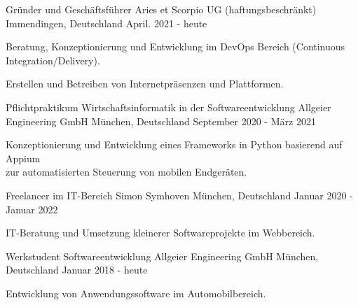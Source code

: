 

\begin{cventries}

  \cventry
    {Gründer und Geschäftsführer} %
    {Aries et Scorpio UG (haftungsbeschränkt)} %
    {Immendingen, Deutschland} %
    {April. 2021 - heute} %
    {
      \begin{cvitems} %
        \item {Beratung, Konzeptionierung und Entwicklung im DevOps Bereich (Continuous Integration/Delivery).}
        \item {Erstellen und Betreiben von Internetpräsenzen und Plattformen. }
      \end{cvitems}
    }
    
  \cventry
    {Pflichtpraktikum Wirtschaftsinformatik in der Softwareentwicklung} %
    {Allgeier Engineering GmbH} %
    {München, Deutschland} %
    {September 2020 - März 2021} %
    {
      \begin{cvitems} %
     	\item {Konzeptionierung und Entwicklung eines Frameworks in Python basierend auf Appium\\zur automatisierten Steuerung von mobilen Endgeräten.}
      \end{cvitems}
    }
   
  \cventry
    {Freelancer im IT-Bereich} %
    {Simon Symhoven} %
    {München, Deutschland} %
    {Januar 2020 - Januar 2022} %
    {
      \begin{cvitems} %
        \item {IT-Beratung und Umsetzung kleinerer Softwareprojekte im Webbereich.}
      \end{cvitems}
    }

  \cventry
    {Werkstudent Softwareentwicklung} %
    {Allgeier Engineering GmbH} %
    {München, Deutschland} %
    {Januar 2018 - heute} %
    {
      \begin{cvitems} %
     	  \item {Entwicklung von Anwendungssoftware im Automobilbereich.}
      \end{cvitems}
    }
    
\end{cventries}
